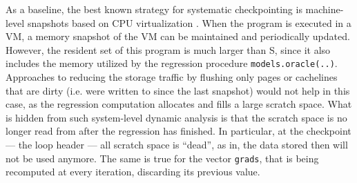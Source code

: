 As a baseline, the best known strategy for systematic checkpointing is machine-level snapshots based on CPU virtualization 
\cite{moshik}.
When the program is executed in a VM, a memory snapshot of the VM can be maintained and periodically updated.
However, the resident set of this program is much larger than S, since it also includes the memory utilized by the regression procedure \lstinline|models.oracle(..)|.
Approaches to reducing the storage traffic by flushing only pages or cachelines that are dirty (i.e. were written to since the last snapshot)
would not help in this case, as the regression computation allocates and fills a large scratch space.
What is hidden from such system-level dynamic analysis is that the scratch space is no longer read from after the regression has finished.
In particular, at the checkpoint --- the loop header --- all scratch space is ``dead'', as in,
the data stored then will not be used anymore.
The same is true for the vector \lstinline|grads|, that is being recomputed at every iteration, discarding its previous value.
